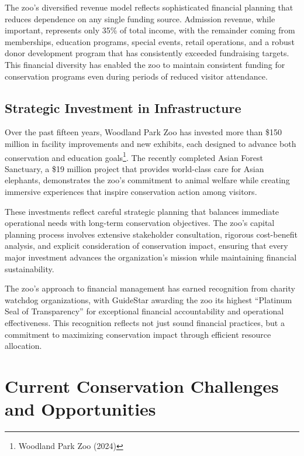 \documentclass[
  Letterpaper,
]{scrbook}
\begin{document}
The zoo's diversified revenue model reflects sophisticated financial
planning that reduces dependence on any single funding source. Admission
revenue, while important, represents only 35\% of total income, with the
remainder coming from memberships, education programs, special events,
retail operations, and a robust donor development program that has
consistently exceeded fundraising targets. This financial diversity has
enabled the zoo to maintain consistent funding for conservation programs
even during periods of reduced visitor attendance.

\subsection{Strategic Investment in
Infrastructure}\label{strategic-investment-in-infrastructure}

Over the past fifteen years, Woodland Park Zoo has invested more than
\$150 million in facility improvements and new exhibits, each designed
to advance both conservation and education goals\footnote{Woodland Park
  Zoo (2024)}. The recently completed Asian Forest Sanctuary, a \$19
million project that provides world-class care for Asian elephants,
demonstrates the zoo's commitment to animal welfare while creating
immersive experiences that inspire conservation action among visitors.

These investments reflect careful strategic planning that balances
immediate operational needs with long-term conservation objectives. The
zoo's capital planning process involves extensive stakeholder
consultation, rigorous cost-benefit analysis, and explicit consideration
of conservation impact, ensuring that every major investment advances
the organization's mission while maintaining financial sustainability.

The zoo's approach to financial management has earned recognition from
charity watchdog organizations, with GuideStar awarding the zoo its
highest ``Platinum Seal of Transparency'' for exceptional financial
accountability and operational effectiveness. This recognition reflects
not just sound financial practices, but a commitment to maximizing
conservation impact through efficient resource allocation.

\section{Current Conservation Challenges and
Opportunities}\label{current-conservation-challenges-and-opportunities}
\end{document}
